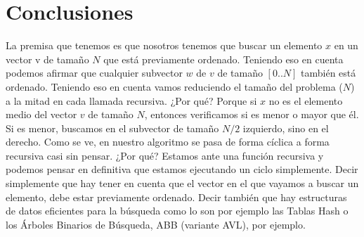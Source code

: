 
\section{Conclusiones}

La premisa que tenemos es que nosotros tenemos que buscar un elemento $x$ en un vector v de tamaño $N$ que está previamente ordenado. Teniendo eso en cuenta podemos afirmar que cualquier subvector $w$ de $v$ de tamaño $[0..N]$ también está ordenado.
Teniendo eso en cuenta vamos reduciendo el tamaño del problema ($N$) a la mitad en cada llamada recursiva. ¿Por qué? Porque si $x$ no es el elemento medio del vector $v$ de tamaño $N$, entonces verificamos si es menor o mayor que él. Si es menor, buscamos en el subvector de tamaño $N/2$ izquierdo, sino en el derecho.
Como se ve, en nuestro algoritmo se pasa de forma cíclica a forma recursiva casi sin pensar. ¿Por qué? Estamos ante una función recursiva y podemos pensar en definitiva que estamos ejecutando un ciclo simplemente. Decir simplemente que hay tener en cuenta que el vector en el que vayamos a buscar un elemento, debe estar previamente ordenado.
Decir también que hay estructuras de datos eficientes para la búsqueda como lo son por ejemplo las Tablas Hash o los Árboles Binarios de Búsqueda, ABB (variante AVL), por ejemplo.

